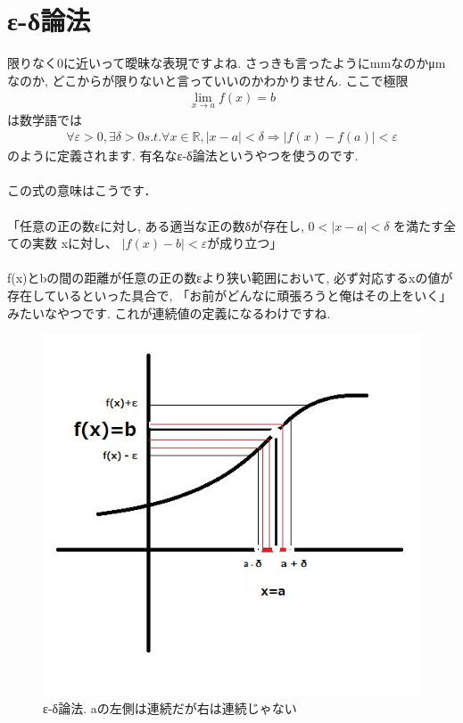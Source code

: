 \documentclass[11pt,a4paper]{jreport}
\begin{document}
\section{ε-δ論法 \label{ed}}
限りなく0に近いって曖昧な表現ですよね. さっきも言ったようにmmなのかμmなのか, どこからが限りないと言っていいのかわかりません. ここで極限
\begin{eqnarray}
\lim_{x\to a} f(x) = b
\end{eqnarray}
は数学語では
\begin{eqnarray}
\forall \varepsilon >0, \exists \delta>0  s.t.  \forall x \in \mathbb{R}, |x-a|<\delta \Rightarrow |f(x)-f(a)|<\varepsilon
\label{eq:ed}
\end{eqnarray}
のように定義されます. 有名なε-δ論法というやつを使うのです.\\
\\
この式の意味はこうです．\\
\\
「任意の正の数εに対し, ある適当な正の数δが存在し, $ 0 < |x − a| < δ$ を満たす全ての実数 xに対し、 $|f(x) − b| < ε$が成り立つ」\\
\\
f(x)とbの間の距離が任意の正の数εより狭い範囲において, 必ず対応するxの値が存在しているといった具合で, 「お前がどんなに頑張ろうと俺はその上をいく」みたいなやつです. これが連続値の定義になるわけですね.

\begin{figure}[H]
\label{im:ed}
  \centering
  \includegraphics[width=120mm,bb=0 0 510 487]{figures/ed.jpg}
  \caption{ε-δ論法. aの左側は連続だが右は連続じゃない}
\end{figure}
\end{document}
